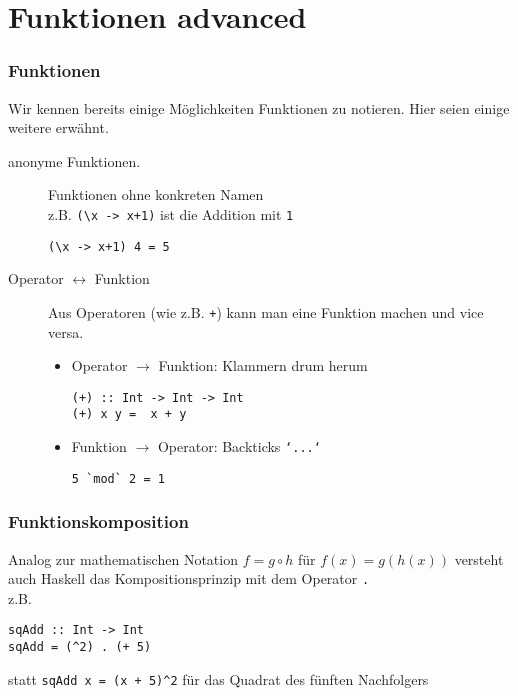 \documentclass{beamer}
\begin{document}

\section{Funktionen advanced}


\begin{frame}[fragile] \frametitle{Funktionen}
	Wir kennen bereits einige Möglichkeiten Funktionen zu notieren. Hier seien einige weitere erwähnt.
	\begin{description}
		\item[anonyme Funktionen.] Funktionen ohne konkreten Namen \\
		z.B. \lstinline[basicstyle=\ttfamily\normalsize]|(\x -> x+1)| ist die Addition mit \texttt{1} 
		\begin{lstlisting}
(\x -> x+1) 4 = 5
		\end{lstlisting}
		\pause
		\item[Operator $\leftrightarrow$ Funktion] Aus Operatoren (wie z.B. \texttt{+}) kann man eine Funktion machen und vice versa.
		\begin{itemize}
			\item Operator $\to$ Funktion: Klammern drum herum
			\begin{lstlisting}
(+) :: Int -> Int -> Int
(+) x y =  x + y
			\end{lstlisting}
			\item Funktion $\to$ Operator: Backticks \texttt{`...`}
			\begin{lstlisting}
5 `mod` 2 = 1
			\end{lstlisting}
		\end{itemize}
	\end{description}
\end{frame}

\begin{frame}[fragile] \frametitle{Funktionskomposition}
	Analog zur mathematischen Notation $f = g \circ h$ für $f(x) = g(h(x))$ versteht auch Haskell das Kompositionsprinzip mit dem Operator \texttt{.} \\
	z.B. 
	\begin{lstlisting}
sqAdd :: Int -> Int
sqAdd = (^2) . (+ 5)
	\end{lstlisting} 
	statt \lstinline[basicstyle=\ttfamily\normalsize]|sqAdd x = (x + 5)^2| für das Quadrat des fünften Nachfolgers
\end{frame}
\end{document}
